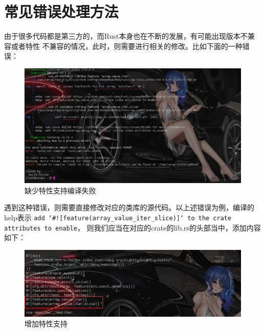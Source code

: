 \section{常见错误处理方法}
由于很多代码都是第三方的，而Rust本身也在不断的发展，有可能出现版本不兼容或者特性
不兼容的情况，此时，则需要进行相关的修改。比如下面的一种错误：
\begin{figure}[H]
  \centering
  \includegraphics[width=\linewidth]{rust_feature_error.png}
  \caption{缺少特性支持编译失败}
  \label{fig:rust_feature_error}
\end{figure}
遇到这种错误，则需要直接修改对应的类库的源代码。以上述错误为例，编译的help表示
\texttt{add `#![feature(array_value_iter_slice)]` to the crate attributes to enable}，
则我们应当在对应的crate的lib.rs的头部当中，添加内容如下：
\begin{figure}[H]
  \centering
  \includegraphics[width=\linewidth]{rust_feature_add.png}
  \caption{增加特性支持}
  \label{fig:rust_feature_add}
\end{figure}
